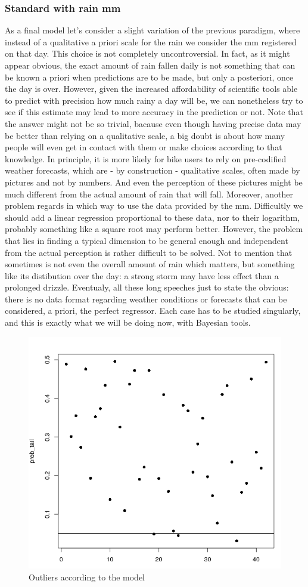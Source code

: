 \documentclass[11pt,twoside]{report}
\begin{document}
\subsubsection{Standard with rain mm}
As a final model let's consider a slight variation of the previous paradigm, where instead of a qualitative a priori scale for the rain we consider the mm registered on that day. This choice is not completely uncontroversial. In fact, as it might appear obvious, the exact amount of rain fallen daily is not something that can be known a priori when predictions are to be made, but only a posteriori, once the day is over. However, given the increased affordability of scientific tools able to predict with precision how much rainy a day will be, we can nonetheless try to see if this estimate may lead to more accuracy in the prediction or not. Note that the answer might not be so trivial, bacause even though having precise data may be better than relying on a qualitative scale, a big doubt is about how many people will even get in contact with them or make choices according to that knowledge. In principle, it is more likely for bike users to rely on pre-codified weather forecasts, which are - by construction - qualitative scales, often made by pictures and not by numbers. And even the perception of these pictures might be much different from the actual amount of rain that will fall. Moreover, another problem regards in which way to use the data provided by the mm. Difficultly we should add a linear regression proportional to these data, nor to their logarithm, probably something like a square root may perform better. However, the problem that lies in finding a typical dimension to be general enough and independent from the actual perception is rather difficult to be solved.  Not to mention that sometimes is not even the overall amount of rain which matters, but something like its distibution over the day: a strong storm may have less effect than a prolonged drizzle. Eventualy, all these long speeches just to state the obvious: there is no data format regarding weather conditions or forecasts that can be considered, a priori, the perfect regressor. Each case has to be studied singularly, and this is exactly what we will be doing now, with Bayesian tools.

\begin{figure}[H]
	\centering
	\includegraphics[width=60 mm]{pictures/m6_out.png}
	\caption{Outliers according to the model}
	\label{fig:M6_out}
\end{figure}
\end{document}
